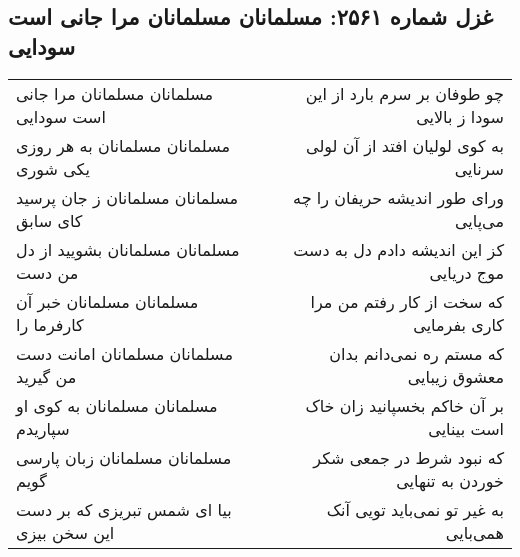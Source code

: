 \begin{center}
\section*{غزل شماره ۲۵۶۱: مسلمانان مسلمانان مرا جانی است سودایی}
\label{sec:2561}
\begin{longtable}{l p{0.5cm} r}
مسلمانان مسلمانان مرا جانی است سودایی
&&
چو طوفان بر سرم بارد از این سودا ز بالایی
\\
مسلمانان مسلمانان به هر روزی یکی شوری
&&
به کوی لولیان افتد از آن لولی سرنایی
\\
مسلمانان مسلمانان ز جان پرسید کای سابق
&&
ورای طور اندیشه حریفان را چه می‌پایی
\\
مسلمانان مسلمانان بشویید از دل من دست
&&
کز این اندیشه دادم دل به دست موج دریایی
\\
مسلمانان مسلمانان خبر آن کارفرما را
&&
که سخت از کار رفتم من مرا کاری بفرمایی
\\
مسلمانان مسلمانان امانت دست من گیرید
&&
که مستم ره نمی‌دانم بدان معشوق زیبایی
\\
مسلمانان مسلمانان به کوی او سپاریدم
&&
بر آن خاکم بخسپانید زان خاک است بینایی
\\
مسلمانان مسلمانان زبان پارسی گویم
&&
که نبود شرط در جمعی شکر خوردن به تنهایی
\\
بیا ای شمس تبریزی که بر دست این سخن بیزی
&&
به غیر تو نمی‌باید تویی آنک همی‌بایی
\\
\end{longtable}
\end{center}
